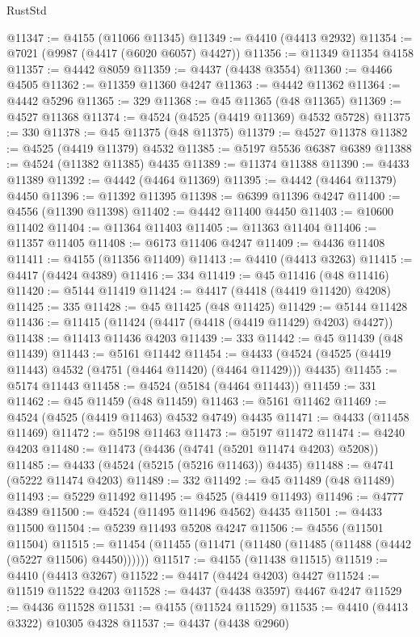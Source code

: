 \begin{lexlean}{RustStd}
\begin{coremodule}
@11347 := @4155 (@11066 @11345)
@11349 := @4410 (@4413 @2932)
@11354 := @7021 (@9987 (@4417 (@6020 @6057) @4427))
@11356 := @11349 @11354 @4158
@11357 := @4442 @8059
@11359 := @4437 (@4438 @3554)
@11360 := @4466 @4505
@11362 := @11359 @11360 @4247
@11363 := @4442 @11362
@11364 := @4442 @5296
@11365 := 329
@11368 := @45 @11365 (@48 @11365)
@11369 := @4527 @11368
@11374 := @4524 (@4525 (@4419 @11369) @4532 @5728)
@11375 := 330
@11378 := @45 @11375 (@48 @11375)
@11379 := @4527 @11378
@11382 := @4525 (@4419 @11379) @4532
@11385 := @5197 @5536 @6387 @6389
@11388 := @4524 (@11382 @11385) @4435
@11389 := @11374 @11388
@11390 := @4433 @11389
@11392 := @4442 (@4464 @11369)
@11395 := @4442 (@4464 @11379) @4450
@11396 := @11392 @11395
@11398 := @6399 @11396 @4247
@11400 := @4556 (@11390 @11398)
@11402 := @4442 @11400 @4450
@11403 := @10600 @11402
@11404 := @11364 @11403
@11405 := @11363 @11404
@11406 := @11357 @11405
@11408 := @6173 @11406 @4247
@11409 := @4436 @11408
@11411 := @4155 (@11356 @11409)
@11413 := @4410 (@4413 @3263)
@11415 := @4417 (@4424 @4389)
@11416 := 334
@11419 := @45 @11416 (@48 @11416)
@11420 := @5144 @11419
@11424 := @4417 (@4418 (@4419 @11420) @4208)
@11425 := 335
@11428 := @45 @11425 (@48 @11425)
@11429 := @5144 @11428
@11436 := @11415 (@11424 (@4417 (@4418 (@4419 @11429) @4203) @4427))
@11438 := @11413 @11436 @4203
@11439 := 333
@11442 := @45 @11439 (@48 @11439)
@11443 := @5161 @11442
@11454 := @4433 (@4524 (@4525 (@4419 @11443) @4532 (@4751 (@4464 @11420) (@4464 @11429))) @4435)
@11455 := @5174 @11443
@11458 := @4524 (@5184 (@4464 @11443))
@11459 := 331
@11462 := @45 @11459 (@48 @11459)
@11463 := @5161 @11462
@11469 := @4524 (@4525 (@4419 @11463) @4532 @4749) @4435
@11471 := @4433 (@11458 @11469)
@11472 := @5198 @11463
@11473 := @5197 @11472
@11474 := @4240 @4203
@11480 := @11473 (@4436 (@4741 (@5201 @11474 @4203) @5208))
@11485 := @4433 (@4524 (@5215 (@5216 @11463)) @4435)
@11488 := @4741 (@5222 @11474 @4203)
@11489 := 332
@11492 := @45 @11489 (@48 @11489)
@11493 := @5229 @11492
@11495 := @4525 (@4419 @11493)
@11496 := @4777 @4389
@11500 := @4524 (@11495 @11496 @4562) @4435
@11501 := @4433 @11500
@11504 := @5239 @11493 @5208 @4247
@11506 := @4556 (@11501 @11504)
@11515 := @11454 (@11455 (@11471 (@11480 (@11485 (@11488 (@4442 (@5227 @11506) @4450))))))
@11517 := @4155 (@11438 @11515)
@11519 := @4410 (@4413 @3267)
@11522 := @4417 (@4424 @4203) @4427
@11524 := @11519 @11522 @4203
@11528 := @4437 (@4438 @3597) @4467 @4247
@11529 := @4436 @11528
@11531 := @4155 (@11524 @11529)
@11535 := @4410 (@4413 @3322) @10305 @4328
@11537 := @4437 (@4438 @2960)

\end{coremodule}
\end{lexlean}
